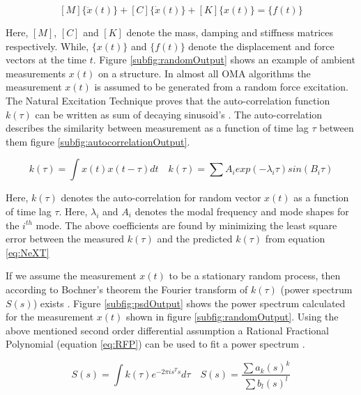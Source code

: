 \begin{equation}\label{eq:secondOrderSystem}
    [M]\{\ddot{x}(t)\} + [C]\{\dot{x}(t)\} + [K]\{x(t)\} = \{f(t)\}
\end{equation}

Here, $[M]$, $[C]$ and $[K]$ denote the mass, damping and stiffness matrices respectively. While, $\{x(t)\}$ and $\{f(t)\}$ denote the displacement and force vectors at the time $t$. Figure \ref{subfig:randomOutput} shows an example of ambient measurements $x(t)$ on a structure.  In almost all OMA algorithms the measurement $x(t)$ is assumed to be generated from a random force excitation. The Natural Excitation Technique \cite{james1995natural} proves that the auto-correlation function $k(\tau)$ can be written as sum of decaying sinusoid's \cite{spitznogle1970representation, ibrahim1977method, guillaume2003poly}. The auto-correlation describes the similarity between measurement as a function of time lag $\tau$ between them figure \ref{subfig:autocorrelationOutput}.  

\begin{equation}\label{eq:NeXT}
    k(\tau) = \int x(t)x(t-\tau)dt \quad k(\tau) = \sum A_{i}exp(-\lambda_{i}\tau)sin(B_{i}\tau)
\end{equation}

Here, $k(\tau)$ denotes the auto-correlation for random vector $x(t)$ as a function of time lag $\tau$. Here, $\lambda_{i}$ and $A_{i}$ denotes the modal frequency and mode shapes for the $i^{th}$ mode. The above coefficients are found by minimizing the least square error between the measured $k(\tau)$ and the predicted $k(\tau)$ from equation \ref{eq:NeXT}

If we assume the measurement $x(t)$ to be a stationary random process, then according to Bochner's theorem the Fourier transform of $k(\tau)$ (power spectrum $S(s)$) exists \cite{bochner2016lectures}. Figure \ref{subfig:psdOutput} shows the power spectrum calculated for the measurement $x(t)$ shown in figure \ref{subfig:randomOutput}. Using the above mentioned second order differential assumption a Rational Fractional Polynomial (equation \ref{eq:RFP}) can be used to fit a power spectrum \cite{richardson1982parameter, allemang1998unified, chauhan2007unified}.

\begin{equation}\label{eq:RFP}
S(s) = \int k(\tau) e^{-2 \pi is^{T} s}d\tau \quad    S(s) = \frac{\sum a_{k}(s)^{k}}{\sum b_{l}(s)^{l}}
\end{equation}

